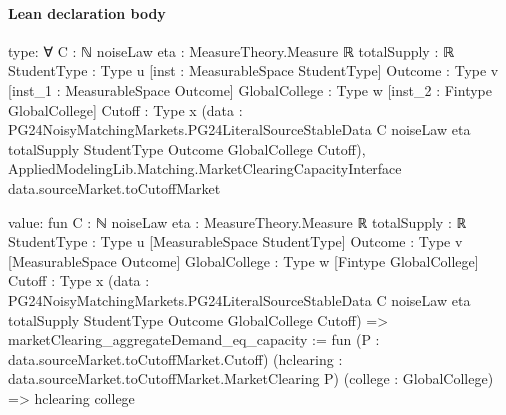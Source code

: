 \documentclass[10pt]{article}
\begin{document}
\paragraph{Lean declaration body}
\begin{ReviewVerbatim}
type:
∀ {C : ℕ} {noiseLaw eta : MeasureTheory.Measure ℝ} {totalSupply : ℝ} {StudentType : Type u}
  [inst : MeasurableSpace StudentType] {Outcome : Type v} [inst_1 : MeasurableSpace Outcome] {GlobalCollege : Type w}
  [inst_2 : Fintype GlobalCollege] {Cutoff : Type x}
  (data :
    PG24NoisyMatchingMarkets.PG24LiteralSourceStableData C noiseLaw eta totalSupply StudentType Outcome GlobalCollege
      Cutoff),
  AppliedModelingLib.Matching.MarketClearingCapacityInterface data.sourceMarket.toCutoffMarket

value:
fun {C : ℕ} {noiseLaw eta : MeasureTheory.Measure ℝ} {totalSupply : ℝ} {StudentType : Type u}
    [MeasurableSpace StudentType] {Outcome : Type v} [MeasurableSpace Outcome] {GlobalCollege : Type w}
    [Fintype GlobalCollege] {Cutoff : Type x}
    (data :
      PG24NoisyMatchingMarkets.PG24LiteralSourceStableData C noiseLaw eta totalSupply StudentType Outcome GlobalCollege
        Cutoff) =>
  {
    marketClearing_aggregateDemand_eq_capacity :=
      fun (P : data.sourceMarket.toCutoffMarket.Cutoff) (hclearing : data.sourceMarket.toCutoffMarket.MarketClearing P)
        (college : GlobalCollege) =>
      hclearing college }
\end{ReviewVerbatim}
\end{document}
